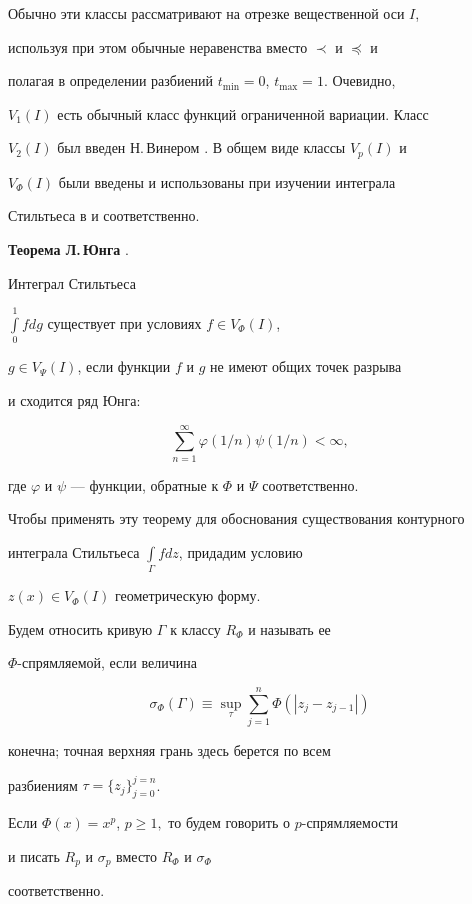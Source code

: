 Обычно эти классы рассматривают на отрезке вещественной оси $I$,


используя при этом обычные неравенства вместо $\prec$ и $\preceq$ и


полагая в определении разбиений $t_{\min} = 0$, $t_{\max} = 1$. Очевидно,


$V_{1}(I)$ есть обычный класс функций ограниченной вариации. Класс


$V_{2}(I)$ был введен Н.\,Винером \cite{W}. В общем виде классы $V_{p}(I)$ и


$V_{\Phi}(I)$ были введены и использованы при изучении интеграла


Стильтьеса в \cite{Y1} и \cite{Y2} соответственно.


\medskip





{\bf Теорема Л.\,Юнга} \cite{Y2}. {\it


Интеграл Стильтьеса


$\int\limits_0^1{fdg}$ существует при условиях $f\in V_{\Phi}(I)$,


$g\in V_{\Psi}(I)$, если функции $f$ и $g$ не имеют общих точек разрыва


и сходится ряд Юнга$:$


$$


\sum_{n=1}^{\infty}\varphi (1/n)\psi (1/n) <\infty,


$$


где $\varphi$ и $\psi$ --- функции, обратные к $\Phi$ и $\Psi$ соответственно.


}


\medskip





Чтобы применять эту теорему для обоснования существования контурного


интеграла Стильтьеса $\int\limits_{\Gamma}{fdz}$, придадим условию


$z(x)\in V_{\Phi}(I)$ геометрическую форму.





\begin{defn}


Будем относить кривую $\Gamma$ к классу $R_{\Phi}$ и называть ее


$\Phi$-спрямляемой, если величина


$$


\sigma_{\Phi}(\Gamma) \equiv


\sup_{\tau}\sum_{j=1}^{n}\Phi(\left|z_{j} - z_{j-1}\right|)


$$


конечна; точная верхняя грань здесь берется по всем


разбиениям $\tau = \{z_{j}\}_{j=0}^{j=n}$.


Если $\Phi (x) = x^p$, $p\ge 1,$ то будем говорить о $p$-спрямляемости


и писать $R_p$ и $\sigma_p$ вместо $R_{\Phi}$ и $\sigma_{\Phi}$


соответственно.


\end{defn}





